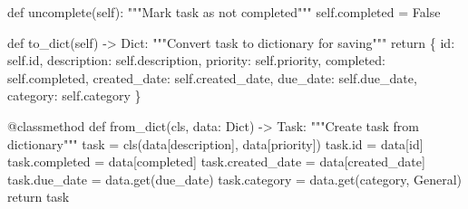 \documentclass[
  letterpaper,
  DIV=11,
  numbers=noendperiod,
  oneside]{scrreprt}
\newenvironment{Shaded}{}{}
\newcommand{\AttributeTok}[1]{\textcolor[rgb]{0.84,0.23,0.29}{#1}}
\newcommand{\BuiltInTok}[1]{\textcolor[rgb]{0.84,0.23,0.29}{#1}}
\newcommand{\CommentTok}[1]{\textcolor[rgb]{0.42,0.45,0.49}{#1}}
\newcommand{\ControlFlowTok}[1]{\textcolor[rgb]{0.84,0.23,0.29}{#1}}
\newcommand{\KeywordTok}[1]{\textcolor[rgb]{0.84,0.23,0.29}{#1}}
\newcommand{\NormalTok}[1]{\textcolor[rgb]{0.14,0.16,0.18}{#1}}
\newcommand{\OperatorTok}[1]{\textcolor[rgb]{0.14,0.16,0.18}{#1}}
\newcommand{\StringTok}[1]{\textcolor[rgb]{0.01,0.18,0.38}{#1}}
\newcommand{\VariableTok}[1]{\textcolor[rgb]{0.89,0.38,0.04}{#1}}
\begin{document}
\begin{Shaded}
\begin{Highlighting}[]
    \KeywordTok{def}\NormalTok{ uncomplete(}\VariableTok{self}\NormalTok{):}
        \CommentTok{"""Mark task as not completed"""}
        \VariableTok{self}\NormalTok{.completed }\OperatorTok{=} \VariableTok{False}
    
    \KeywordTok{def}\NormalTok{ to\_dict(}\VariableTok{self}\NormalTok{) }\OperatorTok{{-}\textgreater{}}\NormalTok{ Dict:}
        \CommentTok{"""Convert task to dictionary for saving"""}
        \ControlFlowTok{return}\NormalTok{ \{}
            \StringTok{\textquotesingle{}id\textquotesingle{}}\NormalTok{: }\VariableTok{self}\NormalTok{.}\BuiltInTok{id}\NormalTok{,}
            \StringTok{\textquotesingle{}description\textquotesingle{}}\NormalTok{: }\VariableTok{self}\NormalTok{.description,}
            \StringTok{\textquotesingle{}priority\textquotesingle{}}\NormalTok{: }\VariableTok{self}\NormalTok{.priority,}
            \StringTok{\textquotesingle{}completed\textquotesingle{}}\NormalTok{: }\VariableTok{self}\NormalTok{.completed,}
            \StringTok{\textquotesingle{}created\_date\textquotesingle{}}\NormalTok{: }\VariableTok{self}\NormalTok{.created\_date,}
            \StringTok{\textquotesingle{}due\_date\textquotesingle{}}\NormalTok{: }\VariableTok{self}\NormalTok{.due\_date,}
            \StringTok{\textquotesingle{}category\textquotesingle{}}\NormalTok{: }\VariableTok{self}\NormalTok{.category}
\NormalTok{        \}}
    
    \AttributeTok{@classmethod}
    \KeywordTok{def}\NormalTok{ from\_dict(cls, data: Dict) }\OperatorTok{{-}\textgreater{}} \StringTok{\textquotesingle{}Task\textquotesingle{}}\NormalTok{:}
        \CommentTok{"""Create task from dictionary"""}
\NormalTok{        task }\OperatorTok{=}\NormalTok{ cls(data[}\StringTok{\textquotesingle{}description\textquotesingle{}}\NormalTok{], data[}\StringTok{\textquotesingle{}priority\textquotesingle{}}\NormalTok{])}
\NormalTok{        task.}\BuiltInTok{id} \OperatorTok{=}\NormalTok{ data[}\StringTok{\textquotesingle{}id\textquotesingle{}}\NormalTok{]}
\NormalTok{        task.completed }\OperatorTok{=}\NormalTok{ data[}\StringTok{\textquotesingle{}completed\textquotesingle{}}\NormalTok{]}
\NormalTok{        task.created\_date }\OperatorTok{=}\NormalTok{ data[}\StringTok{\textquotesingle{}created\_date\textquotesingle{}}\NormalTok{]}
\NormalTok{        task.due\_date }\OperatorTok{=}\NormalTok{ data.get(}\StringTok{\textquotesingle{}due\_date\textquotesingle{}}\NormalTok{)}
\NormalTok{        task.category }\OperatorTok{=}\NormalTok{ data.get(}\StringTok{\textquotesingle{}category\textquotesingle{}}\NormalTok{, }\StringTok{\textquotesingle{}General\textquotesingle{}}\NormalTok{)}
        \ControlFlowTok{return}\NormalTok{ task}
    

\end{Highlighting}
\end{Shaded}
\end{document}

